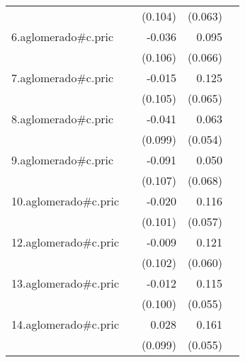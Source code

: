 {\begin{longtable}{l*{4}{D{.}{.}{-1}}}
            &                     &     (0.104)         &     (0.063)         &                     \\
\addlinespace
6.aglomerado#c.pric&                     &      -0.036         &       0.095         &                     \\
            &                     &     (0.106)         &     (0.066)         &                     \\
\addlinespace
7.aglomerado#c.pric&                     &      -0.015         &       0.125         &                     \\
            &                     &     (0.105)         &     (0.065)         &                     \\
\addlinespace
8.aglomerado#c.pric&                     &      -0.041         &       0.063         &                     \\
            &                     &     (0.099)         &     (0.054)         &                     \\
\addlinespace
9.aglomerado#c.pric&                     &      -0.091         &       0.050         &                     \\
            &                     &     (0.107)         &     (0.068)         &                     \\
\addlinespace
10.aglomerado#c.pric&                     &      -0.020         &       0.116\sym{*}  &                     \\
            &                     &     (0.101)         &     (0.057)         &                     \\
\addlinespace
12.aglomerado#c.pric&                     &      -0.009         &       0.121\sym{*}  &                     \\
            &                     &     (0.102)         &     (0.060)         &                     \\
\addlinespace
13.aglomerado#c.pric&                     &      -0.012         &       0.115\sym{*}  &                     \\
            &                     &     (0.100)         &     (0.055)         &                     \\
\addlinespace
14.aglomerado#c.pric&                     &       0.028         &       0.161\sym{**} &                     \\
            &                     &     (0.099)         &     (0.055)         &                     \\

\end{longtable}}

